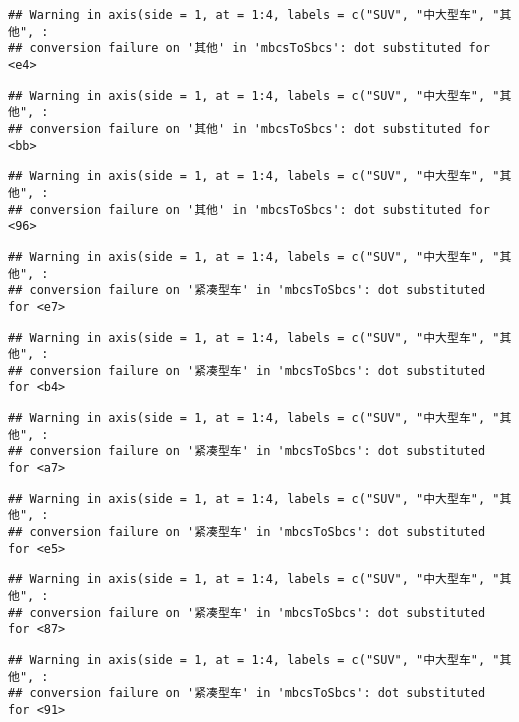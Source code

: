\documentclass[]{article}
\begin{document}
\begin{verbatim}
## Warning in axis(side = 1, at = 1:4, labels = c("SUV", "中大型车", "其他", :
## conversion failure on '其他' in 'mbcsToSbcs': dot substituted for <e4>
\end{verbatim}

\begin{verbatim}
## Warning in axis(side = 1, at = 1:4, labels = c("SUV", "中大型车", "其他", :
## conversion failure on '其他' in 'mbcsToSbcs': dot substituted for <bb>
\end{verbatim}

\begin{verbatim}
## Warning in axis(side = 1, at = 1:4, labels = c("SUV", "中大型车", "其他", :
## conversion failure on '其他' in 'mbcsToSbcs': dot substituted for <96>
\end{verbatim}

\begin{verbatim}
## Warning in axis(side = 1, at = 1:4, labels = c("SUV", "中大型车", "其他", :
## conversion failure on '紧凑型车' in 'mbcsToSbcs': dot substituted for <e7>
\end{verbatim}

\begin{verbatim}
## Warning in axis(side = 1, at = 1:4, labels = c("SUV", "中大型车", "其他", :
## conversion failure on '紧凑型车' in 'mbcsToSbcs': dot substituted for <b4>
\end{verbatim}

\begin{verbatim}
## Warning in axis(side = 1, at = 1:4, labels = c("SUV", "中大型车", "其他", :
## conversion failure on '紧凑型车' in 'mbcsToSbcs': dot substituted for <a7>
\end{verbatim}

\begin{verbatim}
## Warning in axis(side = 1, at = 1:4, labels = c("SUV", "中大型车", "其他", :
## conversion failure on '紧凑型车' in 'mbcsToSbcs': dot substituted for <e5>
\end{verbatim}

\begin{verbatim}
## Warning in axis(side = 1, at = 1:4, labels = c("SUV", "中大型车", "其他", :
## conversion failure on '紧凑型车' in 'mbcsToSbcs': dot substituted for <87>
\end{verbatim}

\begin{verbatim}
## Warning in axis(side = 1, at = 1:4, labels = c("SUV", "中大型车", "其他", :
## conversion failure on '紧凑型车' in 'mbcsToSbcs': dot substituted for <91>
\end{verbatim}
\end{document}
